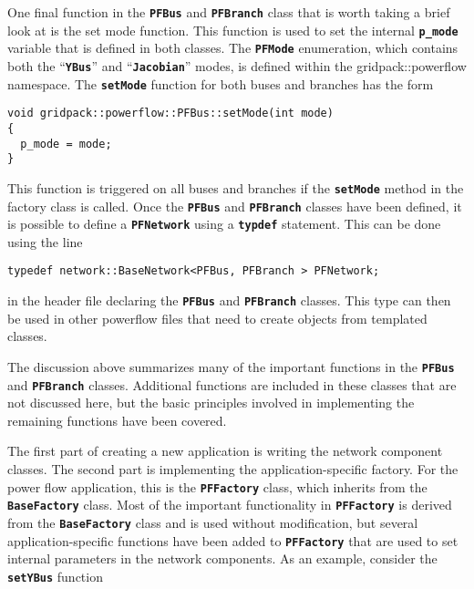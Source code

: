 One final function in the \texttt{\textbf{PFBus}} and \texttt{\textbf{PFBranch}} class that is worth taking a brief look at is the set mode function. This function is used to set the internal \texttt{\textbf{p\_mode}} variable that is defined in both classes. The \texttt{\textbf{PFMode}} enumeration, which contains both the ``\texttt{\textbf{YBus}}'' and ``\texttt{\textbf{Jacobian}}'' modes, is defined within the gridpack::powerflow namespace. The \texttt{\textbf{setMode}} function for both buses and branches has the form

{
\color{red}
\begin{Verbatim}[fontseries=b]
void gridpack::powerflow::PFBus::setMode(int mode)
{
  p_mode = mode;
}
\end{Verbatim}
}

This function is triggered on all buses and branches if the \texttt{\textbf{setMode}} method in the factory class is called.
Once the \texttt{\textbf{PFBus}} and \texttt{\textbf{PFBranch}} classes have been defined, it is possible to define a \texttt{\textbf{PFNetwork}} using a \texttt{\textbf{typdef}} statement. This can be done using the line

{
\color{red}
\begin{Verbatim}[fontseries=b]
typedef network::BaseNetwork<PFBus, PFBranch > PFNetwork;
\end{Verbatim}
}

in the header file declaring the \texttt{\textbf{PFBus}} and \texttt{\textbf{PFBranch}} classes. This type can then be used in other powerflow files that need to create objects from templated classes.

The discussion above summarizes many of the important functions in the \texttt{\textbf{PFBus}} and \texttt{\textbf{PFBranch}} classes. Additional functions are included in these classes that are not discussed here, but the basic principles involved in implementing the remaining functions have been covered. 

The first part of creating a new application is writing the network component classes. The second part is implementing the application-specific factory. For the power flow application, this is the \texttt{\textbf{PFFactory}} class, which inherits from the \texttt{\textbf{BaseFactory}} class. Most of the important functionality in \texttt{\textbf{PFFactory}} is derived from the \texttt{\textbf{BaseFactory}} class and is used without modification, but several application-specific functions have been added to \texttt{\textbf{PFFactory}} that are used to set internal parameters in the network components. As an example, consider the \texttt{\textbf{setYBus}} function

